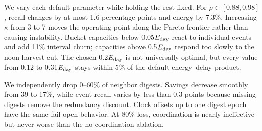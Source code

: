 We vary each default parameter while holding the rest fixed.  For
$\rho\in[0.88,0.98]$, recall changes by at most 1.6 percentage points and energy
by 7.3\%.  Increasing $\kappa$ from 3 to 7 moves the operating point along the
Pareto frontier rather than causing instability.  Bucket capacities below
0.05$E_{\mathrm{day}}$ react to individual events and add 11\% interval churn; capacities
above 0.5$E_{\mathrm{day}}$ respond too slowly to the noon harvest cut.  The chosen
0.2$E_{\mathrm{day}}$ is not universally optimal, but every value from 0.12 to
0.31$E_{\mathrm{day}}$ stays within 5\% of the default energy--delay product.

We independently drop 0--60\% of neighbor digests.  Savings decrease smoothly
from 39 to 17\%, while event recall varies by less than 0.3 points because
missing digests remove the redundancy discount.  Clock offsets up to one
digest epoch have the same fail-open behavior.  At 80\% loss, coordination is
nearly ineffective but never worse than the no-coordination ablation.
